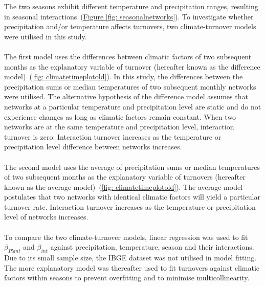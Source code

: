 \documentclass[11pt]{article}
\begin{document}
The two seasons exhibit different temperature and precipitation ranges, resulting in seasonal interactions~(\hyperref[fig: seasonalnetworks]{Figure \ref{fig: seasonalnetworks}}). To investigate whether precipitation and/or temperature affects turnovers, two climate-turnover models were utilised in this study. \\
\\
The first model uses the differences between climatic factors of two subsequent months as the explanatory variable of turnover (hereafter known as the difference model)~(\autoref{fig: climatetimeplotold}). In this study, the differences between the precipitation sums or median temperatures of two subsequent monthly networks were utilised. The alternative hypothesis of the difference model assumes that networks at a particular temperature and precipitation level are static and do not experience changes as long as climatic factors remain constant. When two networks are at the same temperature and precipitation level, interaction turnover is zero. Interaction turnover increases as the temperature or precipitation level difference between networks increases.\\
\\
The second model uses the average of precipitation sums or median temperatures of two subsequent months as the explanatory variable of turnovers (hereafter known as the average model)~(\autoref{fig: climatetimeplotold}). The average model postulates that two networks with identical climatic factors will yield a particular turnover rate. Interaction turnover increases as the temperature or precipitation level of networks increases.\\
\\
To compare the two climate-turnover models, linear regression was used to fit $\beta_{Plant}$ and $\beta_{int}$ against precipitation, temperature, season and their interactions. Due to its small sample size, the IBGE dataset was not utilised in model fitting. The more explanatory model was thereafter used to fit turnovers against climatic factors within seasons to prevent overfitting and to minimise multicollinearity.
\end{document}

